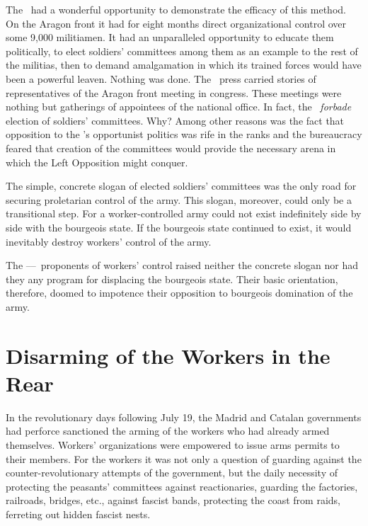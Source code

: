 The \POUM\ had a wonderful opportunity to demonstrate the efficacy of this method. On the Aragon front it had for eight months direct organizational control over some 9,000 militiamen. It had an unparalleled opportunity to educate them politically, to elect soldiers’ committees among them as an example to the rest of the militias, then to demand amalgamation in which its trained forces would have been a powerful leaven. Nothing was done. The \POUM\ press carried stories of representatives of the Aragon front meeting in congress. These meetings were nothing but gatherings of appointees of the national office. In fact, the \POUM\ \emph{forbade} election of soldiers’ committees. Why? Among other reasons was the fact that opposition to the \POUM’s opportunist politics was rife in the ranks and the bureaucracy feared that creation of the committees would provide the necessary arena in which the Left Opposition might conquer.

The simple, concrete slogan of elected soldiers’ committees was the only road for securing proletarian control of the army. This slogan, moreover, could only be a transitional step. For a worker-controlled army could not exist indefinitely side by side with the bourgeois state. If the bourgeois state continued to exist, it would inevitably destroy workers’ control of the army.

The \POUM--\CNT--\UGT\ proponents of workers’ control raised neither the concrete slogan nor had they any program for displacing the bourgeois state. Their basic orientation, therefore, doomed to impotence their opposition to bourgeois domination of the army.

\newpage
\bigskip

\section{Disarming of the Workers in the Rear}

In the revolutionary days following July 19, the Madrid and Catalan governments had perforce sanctioned the arming of the workers who had already armed themselves. Workers’ organizations were empowered to issue arms permits to their members. For the workers it was not only a question of guarding against the counter-revolutionary attempts of the government, but the daily necessity of protecting the peasants’ committees against reactionaries, guarding the factories, railroads, bridges, etc., against fascist bands, protecting the coast from raids, ferreting out hidden fascist nests.

